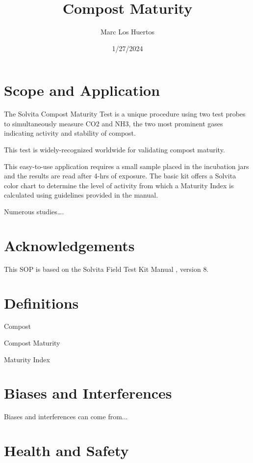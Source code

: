 \documentclass[12pt]{../SOP4_alpha}\usepackage[]{graphicx}\usepackage[]{xcolor}
\title{Compost Maturity}
\date{1/27/2024}
\author{Marc Los Huertos}
\begin{document}

\maketitle

\section{Scope and Application}

\NP The Solvita Compost Maturity Test is a unique procedure using two test probes to simultaneously measure CO2 and NH3, the two most prominent gases indicating activity and stability of compost.

\NP This test is widely-recognized worldwide for validating compost maturity.

\NP This easy-to-use application requires a small sample placed in the incubation jars and the results are read after 4-hrs of exposure.  The basic kit offers a Solvita color chart to determine the level of activity from which a Maturity Index is calculated using guidelines provided in the manual.

\NP 

\NP Numerous studies\ldots \citep{vargas2005assessing}.

\section{Acknowledgements}

\NP This SOP is based on the Solvita Field Test Kit Manual \citep{solvita2014}, version 8.

\section{Definitions}

\NP Compost

\NP Compost Maturity

\NP Maturity Index

\section{Biases and Interferences}

\NP Biases and interferences can come from...



\section{Health and Safety}
\end{document}
